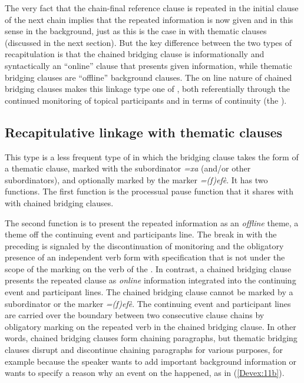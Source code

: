 \documentclass[output=paper]{LSP/langsci}
\begin{document}
The very fact that the chain-final reference clause is repeated in the initial clause of the next chain implies that the repeated information is now given and in this sense in the background, just as this is the case in  with thematic clauses (discussed in the next section). But the key difference between the two types of recapitulation is that the chained bridging clause is informationally and syntactically an ``online'' clause that presents given information, while thematic bridging clauses are ``offline'' background clauses. The on line nature of chained bridging clauses makes this linkage type one of , both referentially through the continued  monitoring of topical participants and in terms of   continuity (the ). 
	
	
\subsection{Recapitulative linkage with thematic clauses} 
\label{Devrecap.link.thematic}
This type is a less frequent type of  in which the bridging clause takes the form of a thematic clause, marked with the subordinator \textit{=xa} (and/or other subordinators), and optionally marked by the  marker \textit{=(f)efè}. It has two functions. The first function is the processual pause function that it shares with  with chained bridging clauses.

The second function is to present the repeated information as an \textit{offline} theme, a theme off the continuing event and participants line. The break in  with the preceding  is signaled by the discontinuation of  monitoring and the
obligatory presence of an independent verb form with  specification that is not under the scope of the  marking on the verb of the .  In contrast, a chained bridging clause presents the repeated clause as \textit{online} information integrated into the continuing event and  participant  lines. The chained bridging clause cannot be marked by a subordinator or the  marker \textit{=(f)efè}. The continuing event and participant lines are carried over the boundary  between two consecutive clause chains by obligatory  marking on the repeated verb in the chained bridging clause. In other words, chained bridging clauses form chaining paragraphs,  but thematic  bridging clauses disrupt and discontinue chaining paragraphs for various purposes, for example because the speaker wants to add important background information or wants to specify a reason why an event on the  happened, as in (\ref{Devex:11b}). 
\end{document}
